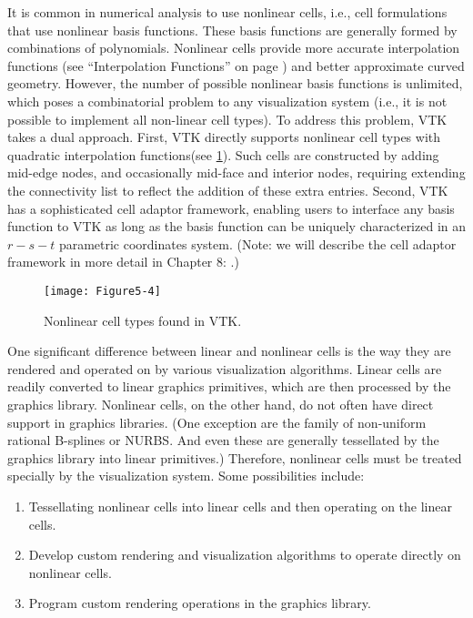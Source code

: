 It is common in numerical analysis to use nonlinear cells, i.e., cell formulations that use nonlinear basis functions. These basis functions are generally formed by combinations of polynomials. Nonlinear cells provide more accurate interpolation functions (see ``Interpolation Functions'' on page \pageref{sec:interpolation_functions}) and better approximate curved geometry. However, the number of possible nonlinear basis functions is unlimited, which poses a combinatorial problem to any visualization system (i.e., it is not possible to implement all non-linear cell types). To address this problem, VTK takes a dual approach. First, VTK directly supports nonlinear cell types with quadratic interpolation functions(see \ref{fig:Figure5-4}). Such cells are constructed by adding mid-edge nodes, and occasionally mid-face and interior nodes, requiring extending the connectivity list to reflect the addition of these extra entries. Second, VTK has a sophisticated cell adaptor framework, enabling users to interface any basis function to VTK as long as the basis function can be uniquely characterized in an $r-s-t$ parametric coordinates system. (Note: we will describe the cell adaptor framework in more detail in Chapter 8: .)


\begin{figure}[!htb]
	\centering
	\texttt{[image: Figure5-4]}
	\caption{Nonlinear cell types found in VTK.}
	\label{fig:Figure5-4}
\end{figure}

One significant difference between linear and nonlinear cells is the way they are rendered and operated on by various visualization algorithms. Linear cells are readily converted to linear graphics primitives, which are then processed by the graphics library. Nonlinear cells, on the other hand, do not often have direct support in graphics libraries. (One exception are the family of non-uniform rational B-splines or NURBS. And even these are generally tessellated by the graphics library into linear primitives.) Therefore, nonlinear cells must be treated specially by the visualization system. Some possibilities include:

\begin{enumerate}

\item Tessellating nonlinear cells into linear cells and then operating on the linear cells.

\item Develop custom rendering and visualization algorithms to operate directly on nonlinear cells.

\item Program custom rendering operations in the graphics library.

\end{enumerate}

